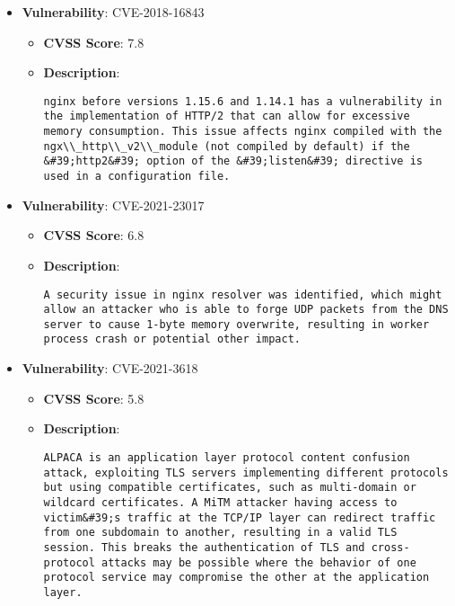 \documentclass{article}
\begin{document}
\begin{itemize}
        \item \textbf{Vulnerability}: CVE-2018-16843
        \begin{itemize}
            \item \textbf{CVSS Score}:  7.8 
            \item \textbf{Description}:
            \parbox[t]{0.9\linewidth}{
                \verb|nginx before versions 1.15.6 and 1.14.1 has a vulnerability in the implementation of HTTP/2 that can allow for excessive memory consumption. This issue affects nginx compiled with the ngx\\_http\\_v2\\_module (not compiled by default) if the &#39;http2&#39; option of the &#39;listen&#39; directive is used in a configuration file.|
            }
        \end{itemize}
    
        \item \textbf{Vulnerability}: CVE-2021-23017
        \begin{itemize}
            \item \textbf{CVSS Score}:  6.8 
            \item \textbf{Description}:
            \parbox[t]{0.9\linewidth}{
                \verb|A security issue in nginx resolver was identified, which might allow an attacker who is able to forge UDP packets from the DNS server to cause 1-byte memory overwrite, resulting in worker process crash or potential other impact.|
            }
        \end{itemize}
    
        \item \textbf{Vulnerability}: CVE-2021-3618
        \begin{itemize}
            \item \textbf{CVSS Score}:  5.8 
            \item \textbf{Description}:
            \parbox[t]{0.9\linewidth}{
                \verb|ALPACA is an application layer protocol content confusion attack, exploiting TLS servers implementing different protocols but using compatible certificates, such as multi-domain or wildcard certificates. A MiTM attacker having access to victim&#39;s traffic at the TCP/IP layer can redirect traffic from one subdomain to another, resulting in a valid TLS session. This breaks the authentication of TLS and cross-protocol attacks may be possible where the behavior of one protocol service may compromise the other at the application layer.|
            }
        \end{itemize}
    

\end{itemize}
\end{document}
